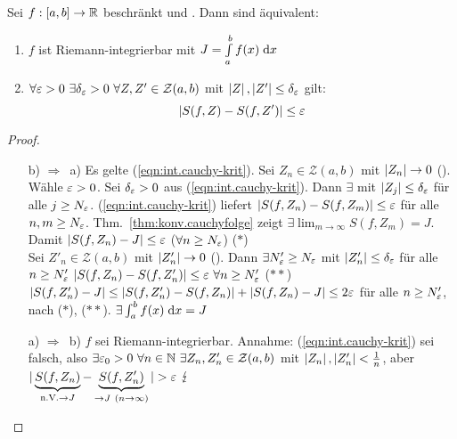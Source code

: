 \documentclass[12pt]{scrreprt}
\begin{document}
\begin{lem}
  \label{lem:int.cauchy-krit}
  Sei $f: [a,b]\rightarrow\mathbb{R}$ beschränkt und . Dann sind äquivalent:
  \begin{enumerate}
    \item $f$ ist Riemann-integrierbar mit $J=\int\limits_{a}^{b}{f(x)}\;\mathrm{d}x$
    \item $\forall \varepsilon>0\ \exists \delta_\varepsilon>0\ \forall Z,
      Z'\in\mathcal{Z}(a,b)$ mit $\left\lvert Z\right\lvert, \left\lvert Z'\right\lvert \le
      \delta_\varepsilon$ gilt:
      \begin{equation} \label{eqn:int.cauchy-krit}
        \left\lvert S(f,Z)-S(f,Z')\right\lvert\le\varepsilon
      \end{equation}
  \end{enumerate}
\end{lem}
\begin{proof}
  \begin{itemize}
  \item[b)] $\Rightarrow$ \,a) Es gelte
    (\ref{eqn:int.cauchy-krit}). Sei $Z_n\in\mathcal{Z}(a,b)$ mit
    $\left\lvert Z_n\right\lvert\to0$ (\ninf). Wähle $\varepsilon>0$. Sei $\delta_\varepsilon>0$ aus
    (\ref{eqn:int.cauchy-krit}). Dann $\exists$  mit
    $\left\lvert Z_j\right\lvert\le\delta_\varepsilon$ für alle $j\ge
    N_\varepsilon$. (\ref{eqn:int.cauchy-krit}) liefert
    $\left\lvert S(f,Z_n)-S(f,Z_m)\right\lvert\le\varepsilon$ für alle $n,m\ge
    N_\varepsilon$. Thm.~\ref{thm:konv.cauchyfolge} zeigt $\exists
    \lim_{m\to\infty}{S(f,Z_m)}=J$. Damit $\left\lvert S(f,Z_n)-J\right\lvert\le\varepsilon$
    ($\forall n\ge N_\varepsilon$) ($*$)\\
    Sei $Z'_n\in\mathcal{Z}(a,b)$ mit $\left\lvert Z'_n\right\lvert\to0$
    (\ninf). Dann $\exists N'_\varepsilon\ge N_\varepsilon$ mit
    $\left\lvert Z'_n\right\lvert\le\delta_\varepsilon$ für alle $n\ge N'_\varepsilon$
    \folgtnach{\ref{eqn:int.cauchy-krit}}
    $\left\lvert S(f,Z_n)-S(f,Z'_n)\right\lvert\le\varepsilon\ \forall n\ge N'_\varepsilon$
    ($**$)\\
    \folgt
    $\left\lvert S(f,Z_n')-J\right\lvert\le\left\lvert S(f,Z'_n)-S(f,Z_n)\right\lvert+\left\lvert S(f,Z_n)-J\right\lvert\le2\varepsilon$
    für alle $n\ge N'_\varepsilon$, nach ($*$), ($**$). \folgt $\exists
    \int_{a}^{b}{f(x)}\;\mathrm{d}x=J$
  \item[a)] $\Rightarrow$ \,b) $f$ sei Riemann-integrierbar. Annahme:
    (\ref{eqn:int.cauchy-krit}) sei falsch, also $\exists\varepsilon_0>0\
    \forall n\in\mathbb{N}\ \exists Z_n, Z'_n\in\mathcal{Z}(a,b)$ mit
    $\left\lvert Z_n\right\lvert, \left\lvert Z'_n\right\lvert < \tfrac1n$, aber
    $|\underbrace{S(f,Z_n)}_{\text{n.V.}\to
      J}-\underbrace{S(f,Z'_n)}_{\to J\ (n\rightarrow\infty)}| > \varepsilon$ $\lightning$
  \end{itemize}
\end{proof}
\end{document}
